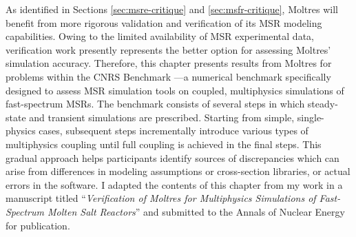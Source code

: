 As identified in Sections \ref{sec:msre-critique} and \ref{sec:msfr-critique},
Moltres will benefit from more rigorous validation and verification of its
\gls{MSR} modeling capabilities. Owing to the limited availability of \gls{MSR}
experimental data, verification work presently represents the better option for
assessing Moltres' simulation accuracy. Therefore, this chapter presents
results from Moltres for problems within the CNRS Benchmark
\cite{tiberga_results_2020}---a numerical benchmark specifically designed to
assess \gls{MSR} simulation tools on coupled, multiphysics simulations of
fast-spectrum \glspl{MSR}. The benchmark consists of several steps in which
steady-state and transient simulations are prescribed. Starting from simple,
single-physics cases, subsequent steps incrementally introduce various types of
multiphysics coupling until full coupling is achieved in the final steps. This
gradual approach helps participants identify sources of discrepancies
which can arise from differences in modeling assumptions or
cross-section libraries, or actual errors in the software. I adapted the
contents of this chapter from my work in a manuscript titled
``\textit{Verification of Moltres for Multiphysics Simulations of Fast-Spectrum
Molten Salt Reactors}'' and submitted to the Annals of Nuclear Energy for
publication.





\begin{subappendices}
    
\end{subappendices}